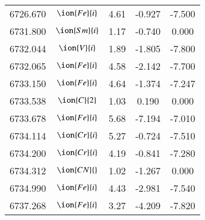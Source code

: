 \documentclass[fleqn,usenatbib]{mnras}
\begin{document}
\begin{center}
\begin{table}
\begin{tabular}{ccccc}
6726.670 &  $\ion{Fe}{i}$  & 4.61 & -0.927 & -7.500 \\ 
6731.800 &  $\ion{Sm}{i}$  & 1.17 & -0.740 & 0.000 \\ 
6732.044 &  $\ion{V}{i}$  & 1.89 & -1.805 & -7.800 \\ 
6732.065 &  $\ion{Fe}{i}$  & 4.58 & -2.142 & -7.700 \\ 
6733.150 &  $\ion{Fe}{i}$  & 4.64 & -1.374 & -7.247 \\ 
6733.538 &  $\ion{C}{2}$ & 1.03 & 0.190 & 0.000 \\ 
6733.678 &  $\ion{Fe}{i}$  & 5.68 & -7.194 & -7.010 \\ 
6734.114 &  $\ion{Cr}{i}$  & 5.27 & -0.724 & -7.510 \\ 
6734.200 &  $\ion{Cr}{i}$  & 4.19 & -0.841 & -7.280 \\ 
6734.312 & $\ion{CN}{}$ & 1.02 & -1.267 & 0.000 \\ 
6734.990 &  $\ion{Fe}{i}$  & 4.43 & -2.981 & -7.540 \\ 
6737.268 &  $\ion{Fe}{i}$  & 3.27 & -4.209 & -7.820 \\
 \end{tabular}
 \end{table}
 \end{center}
\end{document}
